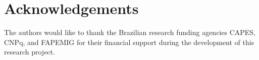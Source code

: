 \documentclass[preprint,12pt]{elsarticle}
\begin{document}
\section*{Acknowledgements}
The authors would like to thank the Brazilian research funding agencies CAPES, CNPq, and FAPEMIG for their financial support during the development of this research project.



\end{document}
